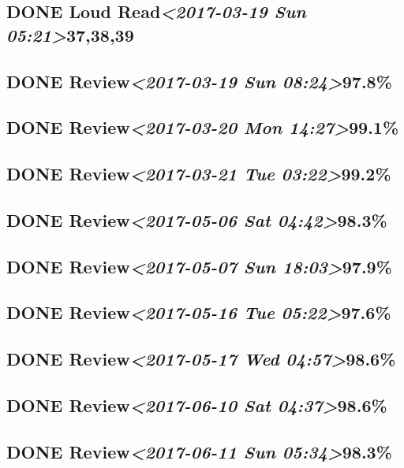 \documentclass[11pt]{ctexart}
\begin{document}
\subsection{{\bfseries\sffamily DONE} Loud Read\textit{<2017-03-19 Sun 05:21>}37,38,39}
\label{sec:orgc8db49a}
\subsection{{\bfseries\sffamily DONE} Review\textit{<2017-03-19 Sun 08:24>}97.8\%}
\label{sec:orgee6b9be}
\subsection{{\bfseries\sffamily DONE} Review\textit{<2017-03-20 Mon 14:27>}99.1\%}
\label{sec:org0095ce0}
\subsection{{\bfseries\sffamily DONE} Review\textit{<2017-03-21 Tue 03:22>}99.2\%}
\label{sec:orgc752d97}
\subsection{{\bfseries\sffamily DONE} Review\textit{<2017-05-06 Sat 04:42>}98.3\%}
\label{sec:org7b49386}
\subsection{{\bfseries\sffamily DONE} Review\textit{<2017-05-07 Sun 18:03>}97.9\%}
\label{sec:org8738710}
\subsection{{\bfseries\sffamily DONE} Review\textit{<2017-05-16 Tue 05:22>}97.6\%}
\label{sec:orgbb9f1c6}
\subsection{{\bfseries\sffamily DONE} Review\textit{<2017-05-17 Wed 04:57>}98.6\%}
\label{sec:org609a7c3}
\subsection{{\bfseries\sffamily DONE} Review\textit{<2017-06-10 Sat 04:37>}98.6\%}
\label{sec:org7741c93}
\subsection{{\bfseries\sffamily DONE} Review\textit{<2017-06-11 Sun 05:34>}98.3\%}
\label{sec:orgace6d8a}
\end{document}
